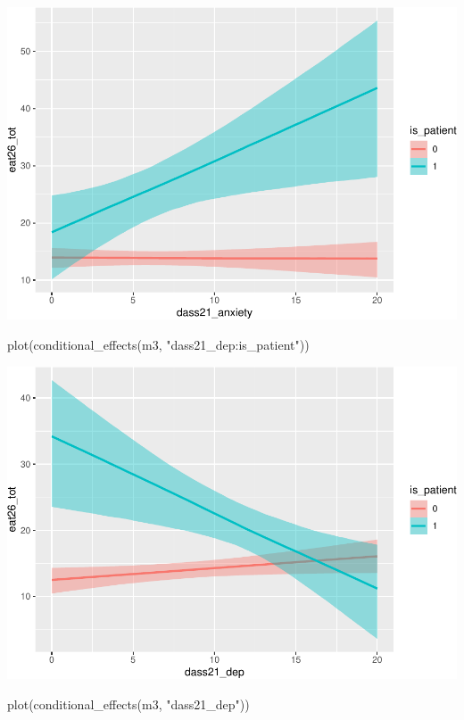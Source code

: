 \documentclass[
]{article}
\newenvironment{Shaded}{\begin{snugshade}}{\end{snugshade}}
\newcommand{\FunctionTok}[1]{\textcolor[rgb]{0.00,0.00,0.00}{#1}}
\newcommand{\NormalTok}[1]{#1}
\newcommand{\StringTok}[1]{\textcolor[rgb]{0.31,0.60,0.02}{#1}}
\begin{document}
\includegraphics{050_quest_groups_files/figure-latex/unnamed-chunk-2-2.pdf}

\begin{Shaded}
\begin{Highlighting}[]
\FunctionTok{plot}\NormalTok{(}\FunctionTok{conditional\_effects}\NormalTok{(m3, }\StringTok{"dass21\_dep:is\_patient"}\NormalTok{))}
\end{Highlighting}
\end{Shaded}

\includegraphics{050_quest_groups_files/figure-latex/unnamed-chunk-2-3.pdf}

\begin{Shaded}
\begin{Highlighting}[]
\FunctionTok{plot}\NormalTok{(}\FunctionTok{conditional\_effects}\NormalTok{(m3, }\StringTok{"dass21\_dep"}\NormalTok{))}
\end{Highlighting}
\end{Shaded}
\end{document}
